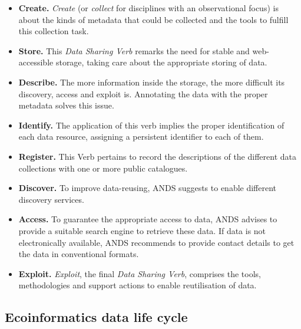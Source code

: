 \begin{itemize}
    \item \textbf{Create.} \textit{Create} (or \textit{collect} for disciplines with an observational focus) is about the kinds of metadata that could be collected and the tools to fulfill this collection task.
    \item \textbf{Store.} This \textit{Data Sharing Verb} remarks the need for stable and web-accessible storage, taking care about the appropriate storing of data.
    \item \textbf{Describe.} The more information inside the storage, the more difficult its discovery, access and exploit is. Annotating the data with the proper metadata solves this issue.
    \item \textbf{Identify.} The application of this verb implies the proper identification of each data resource, assigning a persistent identifier to each of them.
    \item \textbf{Register.} This Verb pertains to record the descriptions of the different data collections with one or more public catalogues.
    \item \textbf{Discover.} To improve data-reusing, ANDS suggests to enable different discovery services.
    \item \textbf{Access.} To guarantee the appropriate access to data, ANDS advises to provide a suitable search engine to retrieve these data. If data is not electronically available, ANDS recommends to provide contact details to get the data in conventional formats.
    \item \textbf{Exploit.} \textit{Exploit}, the final \textit{Data Sharing Verb}, comprises the tools, methodologies and support actions to enable reutilisation of data.
\end{itemize}

\subsection{Ecoinformatics data life cycle}

